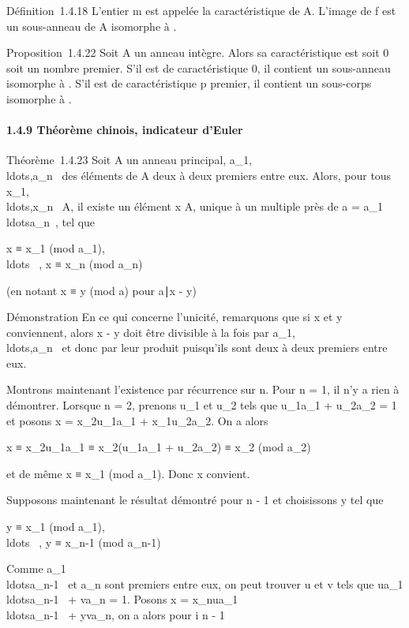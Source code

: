 Définition~1.4.18 L'entier m est appelée la caractéristique de A.
L'image de f est un sous-anneau de A isomorphe à \diagupm{}.

Proposition~1.4.22 Soit A un anneau intègre. Alors sa caractéristique
est soit 0 soit un nombre premier. S'il est de caractéristique 0, il
contient un sous-anneau isomorphe à . S'il est de caractéristique p
premier, il contient un sous-corps isomorphe à \diagupp{}.

\paragraph{1.4.9 Théorème chinois, indicateur d'Euler}

Théorème~1.4.23 Soit A un anneau principal,
a_1,\\ldots,a_n~
des éléments de A deux à deux premiers entre eux. Alors, pour tous
x_1,\\ldots,x_n~
\in A, il existe un élément x \in A, unique à un multiple près de a =
a_1\\ldotsa_n~,
tel que

x ≡ x_1
(mod\,\,a_1),\quad
\\ldots~\quad
, x ≡ x_n (mod\,\,a_n)

(en notant x ≡ y (mod\,\,a) pour
a∣x - y)

Démonstration En ce qui concerne l'unicité, remarquons que si x et y
conviennent, alors x - y doit être divisible à la fois par
a_1,\\ldots,a_n~
et donc par leur produit puisqu'ils sont deux à deux premiers entre eux.

Montrons maintenant l'existence par récurrence sur n. Pour n = 1, il n'y
a rien à démontrer. Lorsque n = 2, prenons u_1 et u_2
tels que u_1a_1 + u_2a_2 = 1 et
posons x = x_2u_1a_1 +
x_1u_2a_2. On a alors

x ≡ x_2u_1a_1 ≡
x_2(u_1a_1 + u_2a_2) ≡
x_2 (mod\,\,a_2)

et de même x ≡ x_1
(mod\,\,a_1). Donc x convient.

Supposons maintenant le résultat démontré pour n - 1 et choisissons y
tel que

y ≡ x_1
(mod\,\,a_1),\quad
\\ldots~\quad
, y ≡ x_n-1
(mod\,\,a_n-1)

Comme
a_1\\ldotsa_n-1~
et a_n sont premiers entre eux, on peut trouver u et v tels que
ua_1\\ldotsa_n-1~
+ va_n = 1. Posons x =
x_nua_1\\ldotsa_n-1~
+ yva_n, on a alors pour i \leq n - 1


